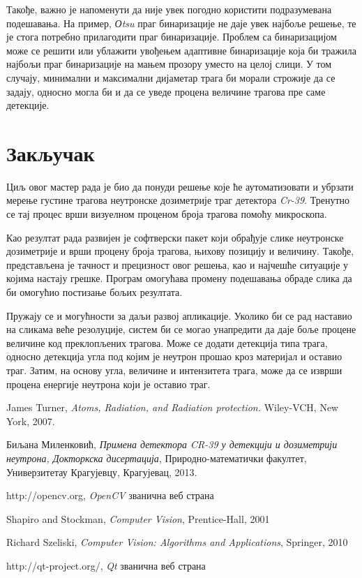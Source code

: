 \documentclass[11pt,a4paper,serbian,oneside]{book}
\begin{document}
Такође, важно је напоменути да није увек погодно користити подразумевана подешавања. На пример, \textit{Оtsu} праг бинаризације не даје увек најбоље решење, те је стога потребно прилагодити праг бинаризације. Проблем са бинаризацијом може се решити или ублажити увођењем адаптивне бинаризације која би тражила најбољи праг бинаризације на мањем прозору уместо на целој слици. У том случају, минимални и максимални дијаметар трага би морали строжије да се задају, односно могла би и да се уведе процена величине трагова пре саме детекције.


%
%
%

\chapter{Закључак}

Циљ овог мастер рада је био да понуди решење које ће аутоматизовати и убрзати мерење густине трагова неутронске дозиметрије траг детектора \textit{Cr-39}. Тренутно се тај процес врши визуелном проценом броја трагова помоћу микроскопа.

Као резултат рада развијен је софтверски пакет који обрађује слике неутронске до\-зи\-мет\-ри\-је и врши процену броја трагова, њихову позицију и величину. Такође, представљена је тачност и прецизност овог решења, као и најчешће ситуације у којима настају грешке. Програм омогућава промену подешавања обраде слика да би омогућио постизање бољих резултата.

Пружају се и могућности за даљи развој апликације. Уколико би се рад наставио на сликама веће резолуције, систем би се могао унапредити да даје боље процене величине код преклопљених трагова. Може се додати детекција типа трага, односно детекција угла под којим је неутрон прошао кроз материјал и оставио траг. Затим, на основу угла, величине и интензитета трага, може да се изврши процена енергије неутрона који је оставио траг.

%
%
%

\begin{thebibliography}{1}

 {James Turner, \textit{Atoms, Radiation, and Radiation protection.} Wiley-VCH, New York, 2007.}

 {Биљана Миленковић, \textit{Примена детектора CR-39 у детекцији и дозиметрији неутрона, Докторкска дисертација}, Природно-математички факултет, Универзитетау Крагујевцу, Крагујевац, 2013.}

 http://opencv.org, \textit{OpenCV} званична веб страна

 Shapiro and Stockman, \textit{Computer Vision}, Prentice-Hall, 2001

 Richard Szeliski,  \textit{Computer Vision: Algorithms and Applications}, Springer, 2010

 http:\slash \slash qt-project.org/, \textit{Qt} званична веб страна

\end{thebibliography}


	
\end{document}
